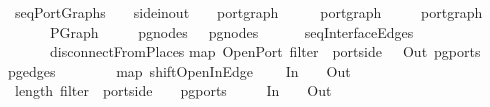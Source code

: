 \ seqPortGraphs\ {\isacharcolon}{\isacharcolon}\ {\isachardoublequoteopen}{\isacharparenleft}\ {\isacharcolon}{\isacharcolon}\ side{\isacharunderscore}in{\isacharunderscore}out{\isacharcomma}\ \ \ \ port{\isacharunderscore}graph\ {\isasymRightarrow}\ {\isacharparenleft}\ \ \ \ port{\isacharunderscore}graph\isanewline
{}\ {\isacharparenleft}\ \ \ \ port{\isacharunderscore}graph{\isachardoublequoteclose}\isanewline
\ \ \ {\isachardoublequoteopen}\ \ {\isacharequal}\ PGraph\isanewline
\ \ \ \ {\isacharparenleft}\ pg{\isacharunderscore}nodes\ \ {\isacharat}\ pg{\isacharunderscore}nodes\ \isanewline
\ \ \ \ {\isacharparenleft}\ seqInterfaceEdges\ \ {\isacharat}\isanewline
\ \ \ \ \ \ disconnectFromPlaces\isanewline
{}map\ OpenPort\ {\isacharparenleft}filter\ {\isacharparenleft}{\isasymlambda}\ port{\isachardot}side\ \ {\isacharequal}\ Out{\isacharparenright}\ {\isacharparenleft}pg{\isacharunderscore}ports\ \isanewline
{}pg{\isacharunderscore}edges\ \ {\isacharat}\isanewline
\ \ \ \ \ \ map\ {\isacharparenleft}shiftOpenInEdge\isanewline
{}\ \ \ {\isacharequal}\ In\ {\isasymor}\ \ {\isacharequal}\ Out\ \ {}\isanewline
{}\ length\ {\isacharparenleft}filter\ {\isacharparenleft}{\isasymlambda}\ port{\isachardot}side\ \ {\isacharequal}\ \ {\isacharparenleft}pg{\isacharunderscore}ports\ \isanewline
{}\ \ \ {\isacharequal}\ In\ {\isasymor}\ \ {\isacharequal}\ Out\ \ {}\isanewline
